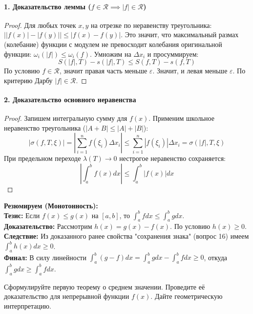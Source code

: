 \paragraph{1. Доказательство леммы ($f \in \mathcal{R} \implies |f| \in \mathcal{R}$)}
\begin{proof}
Для любых точек $x, y$ на отрезке по неравенству треугольника: $\big| |f(x)| - |f(y)| \big| \le |f(x) - f(y)|$.
Это значит, что максимальный размах (колебание) функции с модулем не превосходит колебания оригинальной функции: $\omega_i(|f|) \le \omega_i(f)$.
Умножим на $\Delta x_i$ и просуммируем:
$$ S(|f|, T) - s(|f|, T) \le S(f, T) - s(f, T) $$
По условию $f \in \mathcal{R}$, значит правая часть меньше $\varepsilon$. Значит, и левая меньше $\varepsilon$. По критерию Дарбу $|f| \in \mathcal{R}$.
\end{proof}

\paragraph{2. Доказательство основного неравенства}
\begin{proof}
Запишем интегральную сумму для $f(x)$. Применим школьное неравенство треугольника ($|A+B| \le |A|+|B|$):
$$ \left| \sigma(f, T, \xi) \right| = \left| \sum_{i=1}^n f(\xi_i)\Delta x_i \right| \le \sum_{i=1}^n |f(\xi_i)|\Delta x_i = \sigma(|f|, T, \xi) $$
При предельном переходе $\lambda(T) \to 0$ нестрогое неравенство сохраняется:
$$ \left| \int_a^b f(x) dx \right| \le \int_a^b |f(x)| dx $$
\end{proof}

\begin{tcolorbox}[colback=gray!5, colframe=black, boxrule=0.5pt, arc=0pt]
\textbf{Резюмируем (Монотонность):} \\
\textbf{Тезис:} Если $f(x) \le g(x)$ на $[a,b]$, то $\int_a^b f dx \le \int_a^b g dx$. \\
\textbf{Доказательство:} Рассмотрим $h(x) = g(x) - f(x)$. По условию $h(x) \ge 0$. \\
\textbf{Следствие:} Из доказанного ранее свойства "сохранения знака" (вопрос 16) имеем $\int_a^b h(x) dx \ge 0$. \\
\textbf{Финал:} В силу линейности $\int_a^b (g - f) dx = \int_a^b g dx - \int_a^b f dx \ge 0$, откуда $\int_a^b g dx \ge \int_a^b f dx$.
\end{tcolorbox}

{Сформулируйте первую теорему о среднем значении. Проведите её доказательство для непрерывной функции $f(x)$. Дайте геометрическую интерпретацию.}

